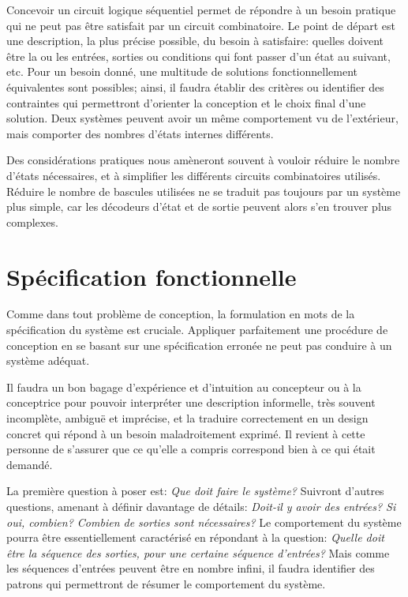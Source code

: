 \documentclass[letter, oneside]{book}
\begin{document}
Concevoir un circuit logique séquentiel permet de répondre à un besoin
pratique qui ne peut pas être satisfait par un circuit combinatoire.
Le point de départ est une description, la plus précise possible, du
besoin à satisfaire: quelles doivent être la ou les entrées, sorties
ou conditions qui font passer d'un état au suivant, etc. Pour un
besoin donné, une multitude de solutions fonctionnellement
équivalentes sont possibles; ainsi, il faudra établir des critères ou
identifier des contraintes qui permettront d'orienter la conception et
le choix final d'une solution. Deux systèmes peuvent avoir un même
comportement vu de l'extérieur, mais comporter des nombres d'états
internes différents.

Des considérations pratiques nous amèneront souvent à vouloir réduire
le nombre d'états nécessaires, et à simplifier les différents circuits
combinatoires utilisés. Réduire le nombre de bascules utilisées ne se
traduit pas toujours par un système plus simple, car les décodeurs
d'état et de sortie peuvent alors s'en trouver plus complexes.

\section{Spécification fonctionnelle}
\label{sec:org72097c4}

Comme dans tout problème de conception, la formulation en mots de la
spécification du système est cruciale. Appliquer parfaitement une
procédure de conception en se basant sur une spécification erronée ne
peut pas conduire à un système adéquat.

Il faudra un bon bagage d'expérience et d'intuition au concepteur ou à
la conceptrice pour pouvoir interpréter une description informelle,
très souvent incomplète, ambiguë et imprécise, et la traduire
correctement en un design concret qui répond à un besoin
maladroitement exprimé. Il revient à cette personne de s'assurer que
ce qu'elle a compris correspond bien à ce qui était demandé.

La première question à poser est: \emph{Que doit faire le système?}
Suivront d'autres questions, amenant à définir davantage de détails:
\emph{Doit-il y avoir des entrées? Si oui, combien? Combien de sorties sont
nécessaires?} Le comportement du système pourra être essentiellement
caractérisé en répondant à la question: \emph{Quelle doit être la séquence
des sorties, pour une certaine séquence d'entrées?} Mais comme les
séquences d'entrées peuvent être en nombre infini, il faudra
identifier des patrons qui permettront de résumer le comportement du
système.
\end{document}
